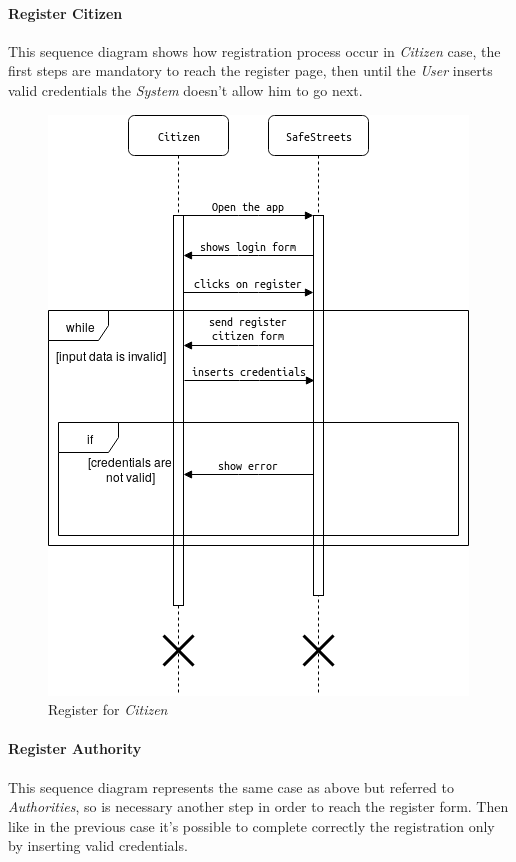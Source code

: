 \documentclass{article}
\begin{document}
\paragraph{Register Citizen}
This sequence diagram shows how registration process occur in \textit{Citizen} case, the first steps are mandatory to reach
the register page, then until the \textit{User} inserts valid credentials the \textit{System} doesn't allow him to go next.  
\begin{figure}[H]
    \centering
    \includegraphics[scale=0.5]{img/sequence_diagrams/register_citizen.png}
    \caption{Register for \textit{Citizen}}
\end{figure}

\clearpage

\paragraph{Register Authority}
This sequence diagram represents the same case as above but referred to \textit{Authorities}, so is necessary another
step in order to reach the register form. Then like in the previous case it's possible to complete correctly the registration
only by inserting valid credentials.
\end{document}
